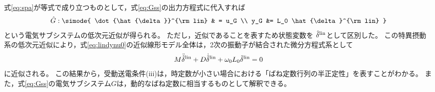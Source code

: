 \documentclass[tombow,dvipdfmx]{corona-a5-1.1}
\begin{document}
式\ref{eq:spa}が等式で成り立つものとして，式\ref{eq:Gss}の出力方程式に代入すれば
\begin{align}\label{eq:Gsssp}
\hat{G}: \simode{
\dot{\hat{\delta}}^{\rm lin} & = u_G \\
y_G &= L_0 \hat{\delta}^{\rm lin}
}
\end{align}
という電気サブシステムの低次元近似が得られる。
ただし，近似であることを表すため状態変数を
$\hat{\delta}^{\rm lin}$として区別した。
この特異摂動系の低次元近似により，式\ref{eq:lindynu0}の近似線形モデル全体は，2次の振動子が結合された微分方程式系として
\begin{align}\label{eq:spamodel}
M \ddot{\hat{\delta}}^{\rm lin}
+ D \dot{\hat{\delta}}^{\rm lin}
+\omega_0 L_0 \hat{\delta}^{\rm lin}=0
\end{align}
に近似される。
この結果から，受動送電条件(iii)は，時定数が小さい場合における「ばね定数行列の半正定性」を表すことがわかる。
また，式\ref{eq:Gss}の電気サブシステム$G$は，動的なばね定数に相当するものとして解釈できる。
\end{document}
